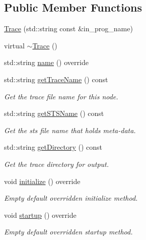 \subsection*{Public Member Functions}
\begin{DoxyCompactItemize}
\item 
\hyperlink{structvt_1_1trace_1_1_trace_a2b736f560ee446cbd84aaf96e25c8d0b}{Trace} (std\+::string const \&in\+\_\+prog\+\_\+name)
\item 
virtual \hyperlink{structvt_1_1trace_1_1_trace_a80b3426aed07572525ef4834b0c4dedd}{$\sim$\+Trace} ()
\item 
std\+::string \hyperlink{structvt_1_1trace_1_1_trace_aaae4bbf6d009229a5c8b9db67a127942}{name} () override
\item 
std\+::string \hyperlink{structvt_1_1trace_1_1_trace_a6825144c1fb635304c957dee8f667b4a}{get\+Trace\+Name} () const
\begin{DoxyCompactList}\small\item\em Get the trace file name for this node. \end{DoxyCompactList}\item 
std\+::string \hyperlink{structvt_1_1trace_1_1_trace_af92da7879adc530c72945530b0bfa11d}{get\+S\+T\+S\+Name} () const
\begin{DoxyCompactList}\small\item\em Get the sts file name that holds meta-\/data. \end{DoxyCompactList}\item 
std\+::string \hyperlink{structvt_1_1trace_1_1_trace_ae2e8213035c557a769cf0fd1a41533a5}{get\+Directory} () const
\begin{DoxyCompactList}\small\item\em Get the trace directory for output. \end{DoxyCompactList}\item 
void \hyperlink{structvt_1_1trace_1_1_trace_a24019edd964c0a307008f8d6a0f1f825}{initialize} () override
\begin{DoxyCompactList}\small\item\em Empty default overridden initialize method. \end{DoxyCompactList}\item 
void \hyperlink{structvt_1_1trace_1_1_trace_a5dd8767d9020ebeaba49ea3a684738a1}{startup} () override
\begin{DoxyCompactList}\small\item\em Empty default overridden startup method. \end{DoxyCompactList}\item 

\end{DoxyCompactItemize}
